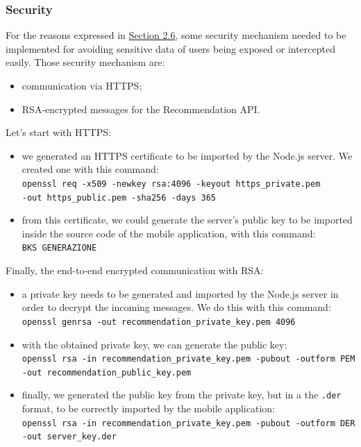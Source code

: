 \documentclass[../../main]{subfiles}
\begin{document}
\subsubsection{Security}
\label{sss:security}

For the reasons expressed in \hyperref[ss:security-in-communication]{Section 2.6}, some security mechanism needed to be implemented for avoiding sensitive data of users being exposed or intercepted easily.
Those security mechanism are:
\begin{itemize}
    \item communication via HTTPS;
    \item RSA-encrypted messages for the Recommendation API.
\end{itemize}
\noindent
Let's start with HTTPS:
\begin{itemize}
    \item we generated an HTTPS certificate to be imported by the Node.js server. We created one with this command:\\
    \texttt{openssl req -x509 -newkey rsa:4096 -keyout https\_private.pem}\\
    \texttt{-out https\_public.pem -sha256 -days 365}
    \item from this certificate, we could generate the server's public key to be imported inside the source code of the mobile application, with this command:\\
    \texttt{BKS GENERAZIONE}
\end{itemize}
\noindent
Finally, the end-to-end encrypted communication with RSA:
\begin{itemize}
    \item a private key needs to be generated and imported by the Node.js server in order to decrypt the incoming messages. We do this with this command:\\
    \texttt{openssl genrsa -out recommendation\_private\_key.pem 4096}
    \item with the obtained private key, we can generate the public key:\\
    \texttt{openssl rsa -in recommendation\_private\_key.pem -pubout -outform PEM}\\
    \texttt{-out recommendation\_public\_key.pem}
    \item finally, we generated the public key from the private key, but in a the \texttt{.der} format, to be correctly imported by the mobile application:\\
    \texttt{openssl rsa -in recommendation\_private\_key.pem -pubout -outform DER}\\
    \texttt{-out server\_key.der}
\end{itemize}
\end{document}
